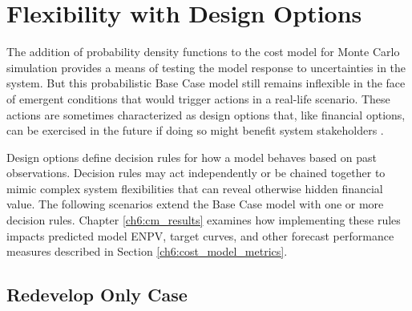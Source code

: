 \section{Flexibility with Design Options}\label{ch4:flex_design_options}

The addition of probability density functions to the cost model for Monte Carlo simulation provides a means of testing the model response to uncertainties in the system. But this probabilistic Base Case model still remains inflexible in the face of emergent conditions that would trigger actions in a real-life scenario. These actions are sometimes characterized as design options that, like financial options, can be exercised in the future if doing so might benefit system stakeholders \citep[p.\ 270--272]{de_neufville_flexibility_2011}.

Design options define decision rules for how a model behaves based on past observations. Decision rules may act independently or be chained together to mimic complex system flexibilities that can reveal otherwise hidden financial value. The following scenarios extend the Base Case model with one or more decision rules. Chapter \ref{ch6:cm_results} examines how implementing these rules impacts predicted model ENPV, target curves, and other forecast performance measures described in Section \ref{ch6:cost_model_metrics}.

\subsection{Redevelop Only Case}\label{ch4:flex_redevelop_case}

